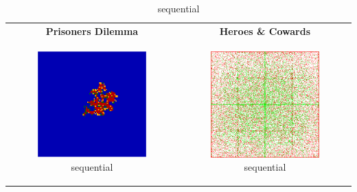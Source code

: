 \begin{table}
	\centering
	
	\begin{tabular}{c c}
		\textbf{Prisoners Dilemma} & \textbf{Heroes \& Cowards} \\ 

		
		\begin{subfigure}[b]{0.4\textwidth}
			\centering
			\includegraphics[width=.7\textwidth, angle=0]{./fig/seq_99x99_217steps_MSG_java.png}
			\caption{sequential}
			\label{fig:pd_seq}
		\end{subfigure}
    	&
		\begin{subfigure}[b]{0.4\textwidth}
			\centering
			\includegraphics[width=.7\textwidth, angle=0]{./fig/seq_HAC_100_000_500steps_java.png}
			\caption{sequential}
			\label{fig:hac_seq}
		\end{subfigure}
    	\\
    	

\end{tabular}
\end{table}
